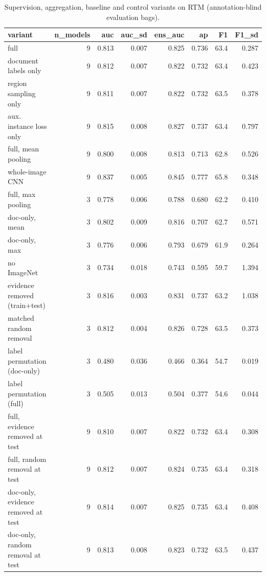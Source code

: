 \begin{table}[t]
\centering
\caption{Supervision, aggregation, baseline and control variants on RTM (annotation-blind evaluation bags).}
\label{tab:rtm_ablation}
\begin{tabular}{lrrrrrrr}
\toprule
variant & n\_models & auc & auc\_sd & ens\_auc & ap & F1 & F1\_sd \\
\midrule
full & 9 & 0.813 & 0.007 & 0.825 & 0.736 & 63.4 & 0.287 \\
document labels only & 9 & 0.812 & 0.007 & 0.822 & 0.732 & 63.4 & 0.423 \\
region sampling only & 9 & 0.811 & 0.007 & 0.822 & 0.732 & 63.5 & 0.378 \\
aux. instance loss only & 9 & 0.815 & 0.008 & 0.827 & 0.737 & 63.4 & 0.797 \\
full, mean pooling & 9 & 0.800 & 0.008 & 0.813 & 0.713 & 62.8 & 0.526 \\
whole-image CNN & 9 & 0.837 & 0.005 & 0.845 & 0.777 & 65.8 & 0.348 \\
full, max pooling & 3 & 0.778 & 0.006 & 0.788 & 0.680 & 62.2 & 0.410 \\
doc-only, mean & 3 & 0.802 & 0.009 & 0.816 & 0.707 & 62.7 & 0.571 \\
doc-only, max & 3 & 0.776 & 0.006 & 0.793 & 0.679 & 61.9 & 0.264 \\
no ImageNet & 3 & 0.734 & 0.018 & 0.743 & 0.595 & 59.7 & 1.394 \\
evidence removed (train+test) & 3 & 0.816 & 0.003 & 0.831 & 0.737 & 63.2 & 1.038 \\
matched random removal & 3 & 0.812 & 0.004 & 0.826 & 0.728 & 63.5 & 0.373 \\
label permutation (doc-only) & 3 & 0.480 & 0.036 & 0.466 & 0.364 & 54.7 & 0.019 \\
label permutation (full) & 3 & 0.505 & 0.013 & 0.504 & 0.377 & 54.6 & 0.044 \\
full, evidence removed at test & 9 & 0.810 & 0.007 & 0.822 & 0.732 & 63.4 & 0.308 \\
full, random removal at test & 9 & 0.812 & 0.007 & 0.824 & 0.735 & 63.4 & 0.318 \\
doc-only, evidence removed at test & 9 & 0.814 & 0.007 & 0.825 & 0.735 & 63.4 & 0.408 \\
doc-only, random removal at test & 9 & 0.813 & 0.008 & 0.823 & 0.732 & 63.5 & 0.437 \\
\bottomrule
\end{tabular}
\end{table}